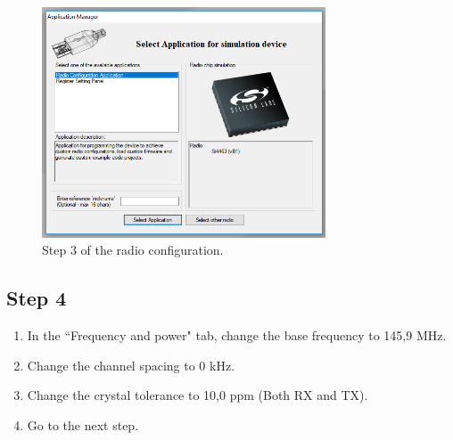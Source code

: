 \documentclass[12pt]{book}
\begin{document}
\begin{appendices}
\begin{figure}[!h]
	\begin{center}
		\includegraphics[width=0.75\textwidth]{figures/wds-tutorial-3.png}
		\caption{Step 3 of the radio configuration.}
		\label{fig:wds-tutorial-step-3}
	\end{center}
\end{figure}

\subsection{Step 4}

\begin{enumerate}
    \item In the ``Frequency and power" tab, change the base frequency to 145,9 MHz.
    \item Change the channel spacing to 0 kHz.
    \item Change the crystal tolerance to 10,0 ppm (Both RX and TX).
    \item Go to the next step.
\end{enumerate}


\end{appendices}
\end{document}
